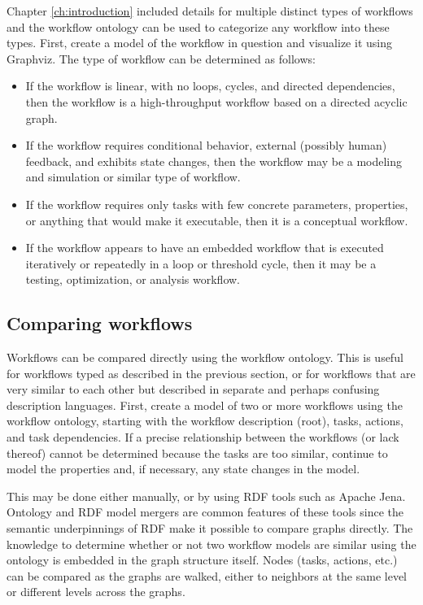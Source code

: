 Chapter \ref{ch:introduction} included details for multiple distinct types of
workflows and the workflow ontology can be used to categorize any workflow into
these types. First, create a model of the workflow in question and visualize it
using Graphviz. The type of workflow can be determined as follows:
\begin{itemize}
  \item If the workflow is linear, with no loops, cycles, and directed
  dependencies, then the workflow is a high-throughput workflow based on a
  directed acyclic graph.
  \item If the workflow requires conditional behavior, external (possibly
  human) feedback, and exhibits state changes, then the workflow may be a
  modeling and simulation or similar type of workflow.
  \item If the workflow requires only tasks with few concrete parameters,
  properties, or anything that would make it executable, then it is a conceptual
  workflow.
  \item If the workflow appears to have an embedded workflow that is executed
  iteratively or repeatedly in a loop or threshold cycle, then it may be a
  testing, optimization, or analysis workflow.
\end{itemize}

\subsection{Comparing workflows}

Workflows can be compared directly using the workflow ontology. This is useful
for workflows typed as described in the previous section, or for workflows that
are very similar to each other but described in separate and perhaps confusing
description languages. First, create a model of two or more workflows using the
workflow ontology, starting with the workflow description (root), tasks,
actions, and task dependencies. If a precise relationship between the workflows
(or lack thereof) cannot be determined because the tasks are too similar,
continue to model the properties and, if necessary, any state changes in the
model.

This may be done either manually, or by using RDF tools such as Apache Jena.
Ontology and RDF model mergers are common features of these tools since the
semantic underpinnings of RDF make it possible to compare graphs directly. The
knowledge to determine whether or not two workflow models are similar using the
ontology is embedded in the graph structure itself. Nodes (tasks, actions,
etc.) can be compared as the graphs are walked, either to neighbors at the same
level or different levels across the graphs.

